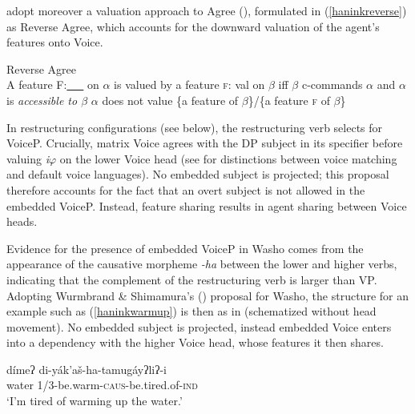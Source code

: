 \documentclass[output=paper]{langscibook}
\begin{document}
\citet{WurmbrandShimamura2017}  adopt moreover a valuation approach to Agree (\citealt{pesetskytorrego2007}), formulated in (\ref{haninkreverse}) as Reverse Agree, which accounts for the downward valuation of the agent's features onto Voice.

\ea Reverse Agree \citep{Wurmbrand2014}\label{haninkreverse}\\
A feature {\scshape F}:\underline{\ \ \ } on $\alpha$ is valued by a feature {\scshape f}: val on $\beta$ iff 
\ea $\beta$ c-commands $\alpha$ and
\ex $\alpha$ is {\itshape accessible to $\beta$}
\ex $\alpha$ does not value \{a feature of $\beta$\}/\{a feature {\scshape f} of $\beta$\}
\z
\z


In restructuring configurations (see below), the restructuring verb selects for VoiceP.  Crucially, matrix Voice agrees with the DP subject in its specifier before valuing {\itshape i}$\varphi$ on the lower Voice head (see \citealt{wurmbrand2015,WurmbrandShimamura2017} for distinctions between voice matching and default voice languages). No embedded subject is projected; this proposal therefore accounts for the fact that an overt subject is not allowed in the embedded VoiceP. Instead, feature sharing results in agent sharing between Voice heads. 


Evidence for the presence of embedded VoiceP in Washo  comes from the appearance of the causative morpheme {\itshape -ha} between the lower and higher verbs, indicating that the complement of the restructuring verb is larger than VP. Adopting  Wurmbrand \& Shimamura's (\citeyear{WurmbrandShimamura2017}) proposal for Washo, the structure for an example such as (\ref{haninkwarmup}) is then as in  (schematized without head movement). No embedded subject is projected, instead embedded Voice enters into a dependency with the higher Voice head, whose features it then shares.
 

\ea \label{haninkwarmup}
\gll dímeʔ di-yák'aš-ha-tamugáyʔliʔ-i\\
water 1/3-be.warm-{\scshape caus}-be.tired.of-{\scshape ind}\\
\glt `I'm tired of warming up the water.'
\z
\end{document}
